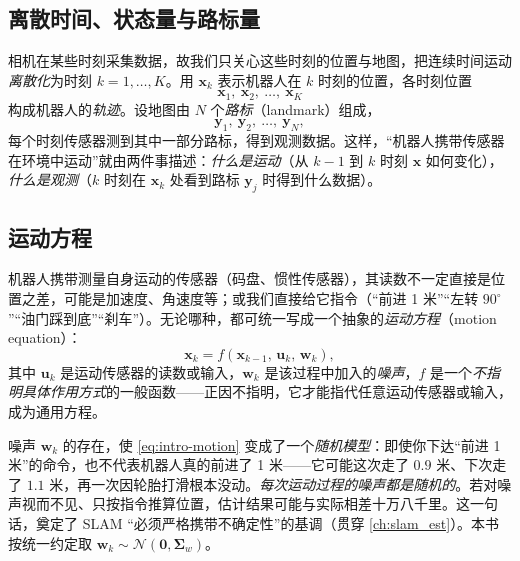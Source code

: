 \subsection{离散时间、状态量与路标量}
\label{sec:intro-discrete}
相机在某些时刻采集数据，故我们只关心这些时刻的位置与地图，把连续时间运动\emph{离散化}为时刻 $k=1,\dots,K$\cite{gaoxiang2019slam14}。用 $\mathbf{x}_k$ 表示机器人在 $k$ 时刻的位置，各时刻位置
\begin{equation}
  \mathbf{x}_1,\ \mathbf{x}_2,\ \dots,\ \mathbf{x}_K
  \label{eq:intro-traj}
\end{equation}
构成机器人的\emph{轨迹}。设地图由 $N$ 个\emph{路标}（landmark）组成，
\begin{equation}
  \mathbf{y}_1,\ \mathbf{y}_2,\ \dots,\ \mathbf{y}_N,
  \label{eq:intro-landmarks}
\end{equation}
每个时刻传感器测到其中一部分路标，得到观测数据。这样，“机器人携带传感器在环境中运动”就由两件事描述：\emph{什么是运动}（从 $k-1$ 到 $k$ 时刻 $\mathbf{x}$ 如何变化），\emph{什么是观测}（$k$ 时刻在 $\mathbf{x}_k$ 处看到路标 $\mathbf{y}_j$ 时得到什么数据）。

\subsection{运动方程}
\label{sec:intro-motion}
机器人携带测量自身运动的传感器（码盘、惯性传感器），其读数不一定直接是位置之差，可能是加速度、角速度等；或我们直接给它指令（“前进 1 米”“左转 $90^\circ$”“油门踩到底”“刹车”）。无论哪种，都可统一写成一个抽象的\emph{运动方程}（motion equation）\cite{gaoxiang2019slam14}：
\begin{equation}
  \mathbf{x}_k = f\!\left(\mathbf{x}_{k-1},\, \mathbf{u}_k,\, \mathbf{w}_k\right),
  \label{eq:intro-motion}
\end{equation}
其中 $\mathbf{u}_k$ 是运动传感器的读数或输入，$\mathbf{w}_k$ 是该过程中加入的\emph{噪声}，$f$ 是一个\emph{不指明具体作用方式}的一般函数——正因不指明，它才能指代任意运动传感器或输入，成为通用方程。

\begin{insight}
噪声 $\mathbf{w}_k$ 的存在，使 \cref{eq:intro-motion} 变成了一个\emph{随机模型}\cite{gaoxiang2019slam14}：即使你下达“前进 1 米”的命令，也不代表机器人真的前进了 1 米——它可能这次走了 $0.9$ 米、下次走了 $1.1$ 米，再一次因轮胎打滑根本没动。\emph{每次运动过程的噪声都是随机的}。若对噪声视而不见、只按指令推算位置，估计结果可能与实际相差十万八千里。这一句话，奠定了 SLAM “必须严格携带不确定性”的基调（贯穿 \cref{ch:slam_est}）。本书按统一约定取 $\mathbf{w}_k\sim\mathcal{N}(\mathbf{0},\boldsymbol{\Sigma}_w)$。
\end{insight}

